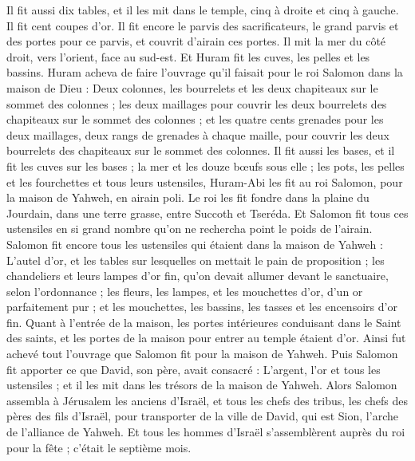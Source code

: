 \begin{multicols}{2}
Il fit aussi dix tables, et il les mit dans le temple, cinq à droite et cinq à gauche. Il fit cent coupes d'or.
Il fit encore le parvis des sacrificateurs, le grand parvis et des portes pour ce parvis, et couvrit d'airain ces portes.
Il mit la mer du côté droit, vers l'orient, face au sud-est.
Et Huram fit les cuves, les pelles et les bassins. Huram acheva de faire l'ouvrage qu'il faisait pour le roi Salomon dans la maison de Dieu :
Deux colonnes, les bourrelets et les deux chapiteaux sur le sommet des colonnes ; les deux maillages pour couvrir les deux bourrelets des chapiteaux sur le sommet des colonnes ;
et les quatre cents grenades pour les deux maillages, deux rangs de grenades à chaque maille, pour couvrir les deux bourrelets des chapiteaux sur le sommet des colonnes.
Il fit aussi les bases, et il fit les cuves sur les bases ;
la mer et les douze bœufs sous elle ;
les pots, les pelles et les fourchettes et tous leurs ustensiles, Huram-Abi les fit au roi Salomon, pour la maison de Yahweh, en airain poli.
Le roi les fit fondre dans la plaine du Jourdain, dans une terre grasse, entre Succoth et Tseréda.
Et Salomon fit tous ces ustensiles en si grand nombre qu'on ne rechercha point le poids de l'airain.
Salomon fit encore tous les ustensiles qui étaient dans la maison de Yahweh : L'autel d'or, et les tables sur lesquelles on mettait le pain de proposition ;
les chandeliers et leurs lampes d'or fin, qu'on devait allumer devant le sanctuaire, selon l'ordonnance ;
les fleurs, les lampes, et les mouchettes d'or, d'un or parfaitement pur ;
et les mouchettes, les bassins, les tasses et les encensoirs d'or fin. Quant à l'entrée de la maison, les portes intérieures conduisant dans le Saint des saints, et les portes de la maison pour entrer au temple étaient d'or.
\VerseOne{}Ainsi fut achevé tout l'ouvrage que Salomon fit pour la maison de Yahweh. Puis Salomon fit apporter ce que David, son père, avait consacré : L'argent, l'or et tous les ustensiles ; et il les mit dans les trésors de la maison de Yahweh.
Alors Salomon assembla à Jérusalem les anciens d'Israël, et tous les chefs des tribus, les chefs des pères des fils d'Israël, pour transporter de la ville de David, qui est Sion, l'arche de l'alliance de Yahweh.
Et tous les hommes d'Israël s'assemblèrent auprès du roi pour la fête ; c'était le septième mois.

\end{multicols}
